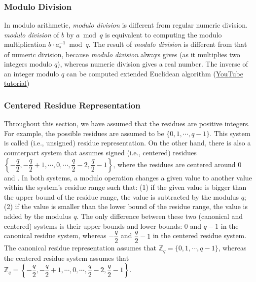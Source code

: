 \subsubsection{Modulo Division}
\label{subsec:modulo-division}

In modulo arithmetic, \textit{modulo division} is different from regular numeric division.  \textit{modulo division} of $b$ by $a \bmod q$ is equivalent to computing the modulo multiplication $b \cdot a_*^{-1} \bmod q$. The result of \textit{modulo division} is different from that of numeric division, because \textit{modulo division} always gives  (as it multiplies two integers modulo $q$), whereas numeric division gives a real number. The inverse of an integer modulo $q$ can be computed  extended Euclidean algorithm (\href{https://www.youtube.com/watch?v=fz1vxq5ts5I}{YouTube tutorial})

\subsubsection{Centered Residue Representation}
\label{subsec:modulo-centered}

Throughout this section, we have assumed that the residues are positive integers. For example, the possible residues  are assumed to be $\{0, 1, \cdots, q-1\}$. This system is called  (i.e., unsigned) residue representation. On the other hand, there is also a counterpart system that assumes signed (i.e., centered) residues $\left\{-\dfrac{q}{2}, -\dfrac{q}{2} + 1, \cdots, 0, \cdots, \dfrac{q}{2} - 2, \dfrac{q}{2} - 1\right\}$, where the residues are centered around $0$ and . In both systems, a modulo operation changes a given value to another value within the system's residue range such that: (1) if the given value is bigger than the upper bound of the residue range, the value is subtracted by the modulus $q$; (2) if the value is smaller than the lower bound of the residue range, the value is added by the modulus $q$. The only difference between these two (canonical and centered) systems is their upper bounds and lower bounds: $0$ and $q-1$ in the canonical residue system, whereas $-\dfrac{q}{2}$ and $\dfrac{q}{2} - 1$ in the centered residue system. The canonical residue representation assumes that $\mathbb{Z}_q = \{0, 1, \cdots, q-1\}$, whereas the centered residue system assumes that $\mathbb{Z}_q = \left\{-\dfrac{q}{2}, -\dfrac{q}{2} + 1, \cdots, 0, \cdots, \dfrac{q}{2} - 2, \dfrac{q}{2} - 1\right\}$. 

